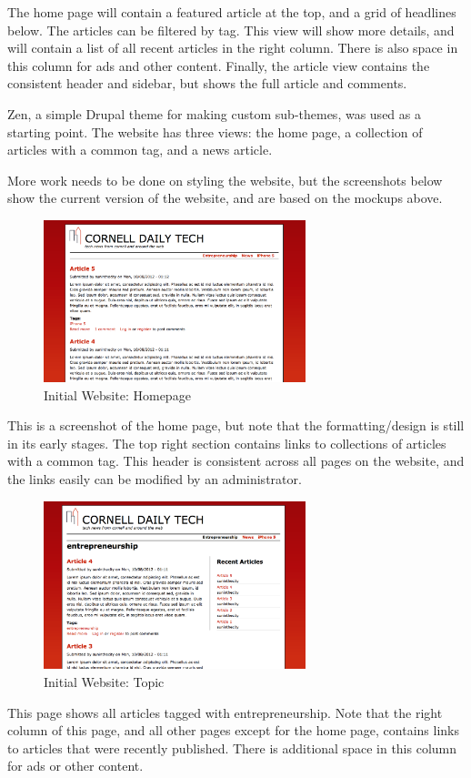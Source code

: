 \documentclass[12pt]{article} %
\begin{document}
The home page will contain a featured article at the top, and a grid of headlines below. The articles can be filtered by tag. This view will show more details, and will contain a list of all recent articles in the right column. There is also space in this column for ads and other content. Finally, the article view contains the consistent header and sidebar, but shows the full article and comments.

Zen, a simple Drupal theme for making custom sub-themes, was used as a starting point. The website has three views: the home page, a collection of articles with a common tag, and a news article.

More work needs to be done on styling the website, but the screenshots below show the current version of the website, and are based on the mockups above.

\begin{figure}[htbp]
\begin{center}
\includegraphics[width=3in]{images/web-main}
\caption{Initial Website: Homepage}
\end{center}
\end{figure}
This is a screenshot of the home page, but note that the formatting/design is still in its early stages. The top right section contains links to collections of articles with a common tag. This header is consistent across all pages on the website, and the links easily can be modified by an administrator.

\begin{figure}[htbp]
\begin{center}
\includegraphics[width=3in]{images/web-topic}
\caption{Initial Website: Topic}
\end{center}
\end{figure}
This page shows all articles tagged with entrepreneurship. Note that the right column of this page, and all other pages except for the home page, contains links to articles that were recently published. There is additional space in this column for ads or other content.
\end{document}
